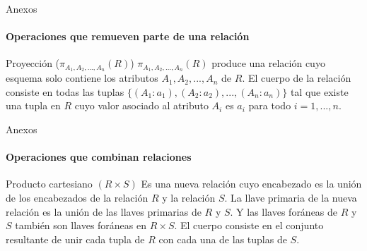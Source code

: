 \begin{frame}{Anexos}
    \framesubtitle{Operaciones que remueven parte de una relaci\'on}

    \begin{block}{Proyecci\'on ($\pi_{A_1,A_2,...,A_n}(R)$)}
        $\pi_{A_1,A_2,...,A_n}(R)$ produce una relaci\'on cuyo
        esquema solo contiene los atributos $A_1,A_2,...,A_n$ de $R$. El cuerpo
        de la relaci\'on consiste en todas las tuplas $\{(A_1 : a_1), (A_2 : a_2),...,(A_n:a_n)\}$
        tal que existe una tupla en $R$ cuyo valor asociado al atributo $A_i$ es $a_i$
        para todo $i = 1,...,n$.


    \end{block}
\end{frame}

\begin{frame}{Anexos}
    \framesubtitle{Operaciones que combinan relaciones}

    \begin{block}{Producto cartesiano $(R \times S)$}
        Es una nueva relaci\'on cuyo encabezado es la uni\'on de los
        encabezados de la relaci\'on $R$ y la relaci\'on $S$. La llave
        primaria de la nueva relaci\'on es la uni\'on de las llaves
        primarias de $R$ y $S$. Y las llaves for\'aneas de $R$ y $S$ tambi\'en
        son llaves for\'aneas en $R \times S$. El cuerpo consiste en el conjunto
        resultante de unir cada tupla de $R$ con cada una de las tuplas de $S$. 
    \end{block}
\end{frame}